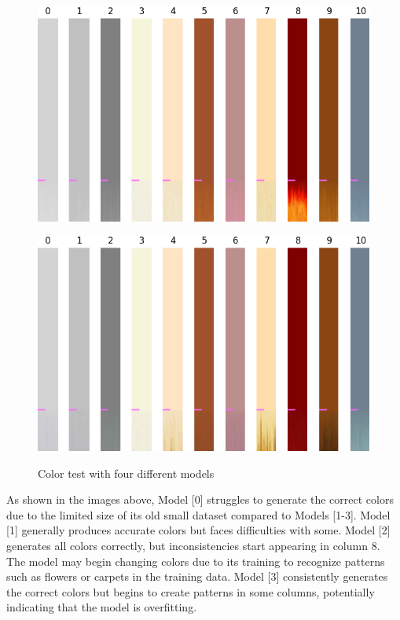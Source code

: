 \begin{itemize}
\begin{figure}[H]
            \begin{minipage}{0.45\textwidth}
                \centering
                \includegraphics[width=\textwidth]{imgs/ColorTest_2.1.8.1_256.png} 
                \label{fig:test1_M2_Cit}
            \end{minipage}
            \hfill
            \begin{minipage}{0.45\textwidth}
                \centering
                \includegraphics[width=\textwidth]{imgs/ColorTest_2.1.8.1_512.png} 
                \label{fig:test1_M3_Cit}
            \end{minipage}
            \caption{Color test with four different models}
        \end{figure}
    
        As shown in the images above, Model [0] struggles to generate the correct colors due to the limited size of its old small dataset compared to Models [1-3]. Model [1] generally produces accurate colors but faces difficulties with some. Model [2] generates all colors correctly, but inconsistencies start appearing in column 8. The model may begin changing colors due to its training to recognize patterns such as flowers or carpets in the training data. Model [3] consistently generates the correct colors but begins to create patterns in some columns, potentially indicating that the model is overfitting.
 

\end{itemize}
